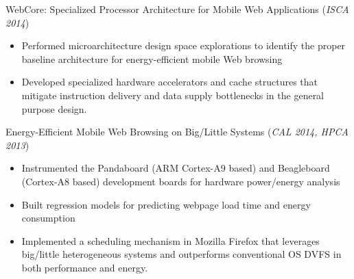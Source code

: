 \documentclass[margin, 9pt]{res} %
\begin{document}
\begin{resume}
\medskip
WebCore: Specialized Processor Architecture for Mobile Web Applications \hfill(\textit{ISCA 2014})\\
\vspace*{-10pt}
\begin{itemize}[leftmargin=*] \itemsep -3pt
\vspace*{-5pt}
	\item Performed microarchitecture design space explorations to identify the proper baseline architecture for energy-efficient mobile Web browsing
	\item Developed specialized hardware accelerators and cache structures that mitigate instruction delivery and data supply bottlenecks in the general purpose design.
\end{itemize}

\medskip
Energy-Efficient Mobile Web Browsing on Big/Little Systems \hfill(\textit{CAL 2014, HPCA 2013})\\
\vspace*{-10pt}
\begin{itemize}[leftmargin=*] \itemsep -3pt
\vspace*{-5pt}
	\item Instrumented the Pandaboard (ARM Cortex-A9 based) and Beagleboard (Cortex-A8 based) development boards for hardware power/energy analysis
	\item Built regression models for predicting webpage load time and energy consumption
	\item Implemented a scheduling mechanism in Mozilla Firefox that leverages big/little heterogeneous systems and outperforms conventional OS DVFS in both performance and energy.
\end{itemize}

%


\end{resume}
\end{document}
